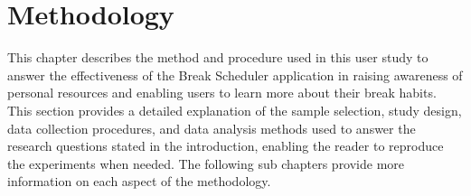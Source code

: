 \documentclass{hasel_thesis}
\begin{document}

\chapter{Methodology}
This chapter describes the method and procedure used in this user study to answer the effectiveness of the Break Scheduler application in raising awareness of personal resources and enabling users to learn more about their break habits. This section provides a detailed explanation of the sample selection, study design, data collection procedures, and data analysis methods used to answer the research questions stated in the introduction, enabling the reader to reproduce the experiments when needed. The following sub chapters provide more information on each aspect of the methodology.
\end{document}
